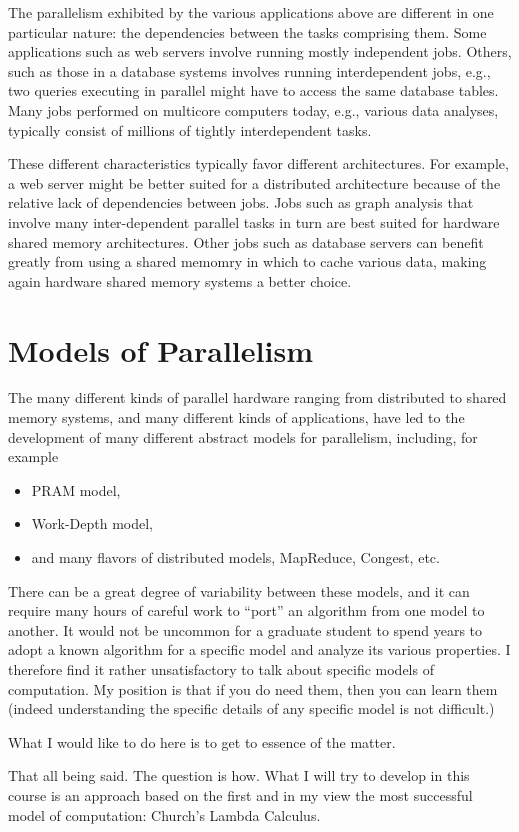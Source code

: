 \begin{gram}
The parallelism exhibited by the various applications above are different in one particular nature: the dependencies between the tasks comprising them.
%
Some applications such as web servers involve running mostly independent jobs.
%
Others, such as those in a database systems involves running interdependent jobs, e.g., two queries executing in parallel might have to access the same database tables.
%
Many jobs performed on multicore computers today, e.g., various data analyses, typically consist of millions of tightly interdependent tasks. 
%

These different characteristics typically favor different architectures.
%
For example, a web server might be better suited for a distributed architecture because of the relative lack of dependencies between jobs.
%
Jobs such as graph analysis that involve many inter-dependent parallel tasks in turn are best suited for hardware shared memory architectures. 
%
Other jobs such as database servers can benefit greatly from using a shared memomry in which to cache various data, making again hardware shared memory systems a better choice.
\end{gram}

\section{Models of Parallelism}

The many different kinds of parallel hardware ranging from distributed to shared memory systems, and many different kinds of applications, have led to the development of many different abstract models for parallelism, including, for example
%
\begin{itemize}
\item PRAM model,
\item Work-Depth model,
\item and many flavors of distributed models, MapReduce, Congest, etc.
\end{itemize}

There can be a great degree of variability between these models, and it can require many hours of careful work to ``port'' an algorithm from one model to another.
%
It would not be uncommon for a graduate student to spend years to adopt a known algorithm for a specific model and analyze its various properties.
%
I therefore find it rather unsatisfactory to talk about specific models of computation.  
%
My position is that if you do need them, then you can learn them (indeed understanding the specific details of any specific model is not difficult.)
%

%
What I would like to do here is to get to essence of the matter.  

That all being said.  The question is how.  
%
What I will try to develop in this course is an approach based on the first and in my view the most successful model of computation: Church's Lambda Calculus.

  



 
